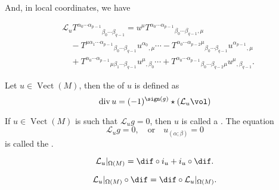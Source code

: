 \documentclass[openany, oneside, a5paper]{book}
\DeclareMathOperator{\Vect}{Vect}
\begin{document}
And, in local coordinates, we have

\begin{align}
    &{\mathcal L_u T^{\alpha_0 \cdots \alpha_{p-1}}}_{\beta_0 \cdots \beta_{q-1}}
    = u^\mu {T^{\alpha_0 \cdots \alpha_{p-1}}}_{\beta_0 \cdots \beta_{q-1} ,\mu}
    \\
    &\quad
    - {T^{\mu \alpha_1 \cdots \alpha_{p-1}}}_{\beta_0 \cdots \beta_{q-1}} {u^{\alpha_0}}_{,\mu}
    \cdots - {T^{\alpha_0 \cdots \alpha_{p-2} \mu}}_{\beta_0 \cdots \beta_{q-1}} {u^{\alpha_{p-1}}}_{,\mu} 
    \\
    &\quad
    + {T^{\alpha_0 \cdots \alpha_{p-1}}}_{\mu\beta_1 \cdots \beta_{q-1}} {u^{\mu}}_{,\beta_0}
    \cdots + {T^{\alpha_0 \cdots \alpha_{p-1}}}_{\beta_0 \cdots \beta_{q-2} \mu} {u^{\mu}}_{,\beta_{q-1}}.
\end{align}

\begin{definition}[Divergence]
    Let $u \in \Vect(M)$, then the  of $u$ is defined as
    \begin{equation}
        \operatorname{div} u = (-1)^{\sign(g)} \star (\mathcal L_u \vol)
    \end{equation}
\end{definition}


\begin{definition}
    If $u \in \Vect(M)$ is such that $\mathcal L_u g = 0$, then $u$ is called a . 
    The equation
    \begin{equation}
        \mathcal L_u g = 0,
        \quad \text{or} \quad
        u_{(\alpha;\beta)} = 0
    \end{equation}
    is called the .
\end{definition}

\begin{theorem}\label{theorem: Cartan formula}
    \begin{equation}
        \mathcal L_u |_{\Omega(M)} = \dif \circ i_u + i_u \circ \dif.
    \end{equation}
\end{theorem}

\begin{corollary}
    \begin{equation}
        \mathcal L_u |_{\Omega(M)} \circ \dif = \dif \circ \mathcal L_u |_{\Omega(M)}.
    \end{equation}
\end{corollary}
\end{document}
